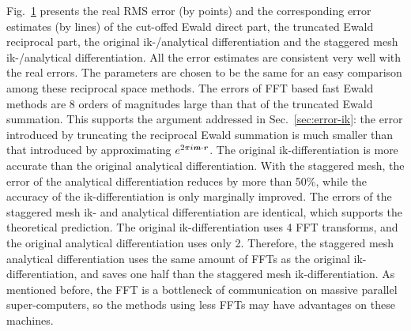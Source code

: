 \documentclass[aps,pre,preprint,unsortedaddress]{revtex4}
\renewcommand{\v}[1]{\textbf{\textit{#1}}}
\begin{document}
\begin{figure}
  \label{fig:error1}
\end{figure}

Fig.~\ref{fig:error1} presents the real RMS error (by points) and the
corresponding error estimates (by lines) of the cut-offed Ewald direct
part, the truncated Ewald reciprocal part, the original ik-/analytical
differentiation and the staggered mesh ik-/analytical
differentiation. All the error estimates are consistent very well
with the real errors.  The parameters are
chosen to be the same for an easy comparison among these 
reciprocal space methods.  The errors of FFT
based fast Ewald methods are 8 orders of magnitudes large than that of
the truncated Ewald summation.
This supports the argument addressed in
Sec.~\ref{sec:error-ik}: the error introduced by truncating the
reciprocal Ewald summation is much smaller than that introduced by
approximating $e^{2\pi i\v m\cdot\v r}$.
The original ik-differentiation is more accurate than
the original analytical differentiation.
With the staggered mesh,
the error of the analytical differentiation reduces by more than 50\%,
while the accuracy of the ik-differentiation is only marginally
improved.
The errors of the staggered mesh ik- and analytical differentiation
are identical, which supports the theoretical prediction.
The original ik-differentiation uses 4
FFT transforms, and the original analytical differentiation uses
only 2.  Therefore, the staggered mesh analytical differentiation uses
the same amount of FFTs as the original ik-differentiation, and saves
one half than the staggered mesh ik-differentiation.  As mentioned before,
the FFT is a bottleneck of communication on massive parallel
super-computers,
so the methods using less FFTs may have advantages on these machines.
\end{document}
